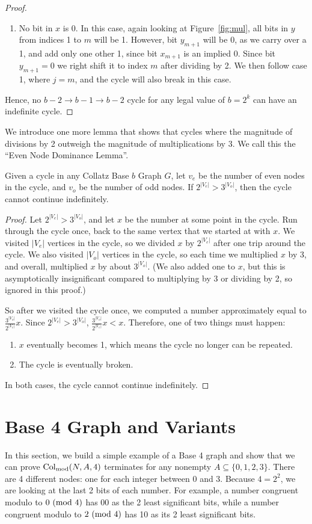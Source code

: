 \begin{proof}
\begin{enumerate}
    \item No bit in $x$ is 0. In this case, again looking at Figure~\ref{fig:mul}, all bits in $y$ from indices 1 to $m$ will be 1. However, bit $y_{m+1}$ will be 0, as we carry over a 1, and add only one other 1, since bit $x_{m+1}$ is an implied 0. Since bit $y_{m+1} = 0$ we right shift it to index $m$ after dividing by 2. We then follow case 1, where $j = m$, and the cycle will also break in this case.
 \end{enumerate}
 Hence, no $b-2 \rightarrow b-1 \rightarrow b-2$ cycle for any legal value of $b = 2^k$ can have an indefinite cycle. 
\end{proof}
We introduce one more lemma that shows that cycles where the magnitude of divisions by 2 outweigh the magnitude of multiplications by 3. We call this the ``Even Node Dominance Lemma''.
\begin{lemma}
\label{lem:EvenDom}
Given a cycle in any Collatz Base $b$ Graph $G$, let $v_{e}$ be the number of even nodes in the cycle, and $v_{o}$ be the number of odd nodes. If $2^{|V_e|} > 3^{|V_o|}$, then the cycle cannot continue indefinitely.
\end{lemma}
\begin{proof}
Let $2^{|V_e|} > 3^{|V_o|}$, and let $x$ be the number at some point in the cycle. Run through the cycle once, back to the same vertex that we started at with $x$. We visited $|V_e|$ vertices in the cycle, so we divided $x$ by $2^{|V_e|}$ after one trip around the cycle. We also visited $|V_o|$ vertices in the cycle, so each time we multiplied $x$ by 3, and overall, multiplied $x$ by about $3^{|V_o|}$. (We also added one to $x$, but this is asymptotically insignificant compared to multiplying by 3 or dividing by 2, so ignored in this proof.)\par
So after we visited the cycle once, we computed a number approximately equal to $\frac{3^{|V_o|}}{2^{|V_e|}}x$. Since $2^{|V_e|} > 3^{|V_o|}$, $\frac{3^{|V_o|}}{2^{|V_e|}}x < x$. Therefore, one of two things must happen:
\begin{enumerate}
\item $x$ eventually becomes 1, which means the cycle no longer can be repeated.
\item The cycle is eventually broken.
\end{enumerate}
In both cases, the cycle cannot continue indefinitely.
\end{proof}
\section{Base 4 Graph and Variants} \label{subsec:base4graph}
In this section, we build a simple example of a Base 4 graph and show that we can prove $\mathrm{Col}_{\text{mod}}(N,A,4)$ terminates for any nonempty $A \subseteq \{0,1,2,3\}$. There are 4 different nodes: one for each integer between 0 and 3. Because $4 = 2^2$, we are looking at the last 2 bits of each number. For example, a number congruent modulo to $0\ (\mathrm{mod}\ 4)$ has 00 as the 2 least significant bits, while a number congruent modulo to $2\ (\mathrm{mod}\ 4)$ has 10 as its 2 least significant bits. 
